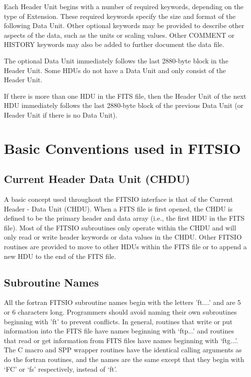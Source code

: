 Each Header Unit begins with a number of required keywords, depending
on the type of Extension.  These required keywords specify the size
and format of the following Data Unit.  Other optional keywords may
be provided to describe other aspects of the data, such as the units
or scaling values.  Other COMMENT or HISTORY keywords may also be added to
further document the data file.

The optional Data Unit immediately follows the last 2880-byte block in
the Header Unit.  Some HDUs do not have a Data Unit and only consist
of the Header Unit.

If there is more than one HDU in the FITS file, then the Header Unit
of the next HDU immediately follows the last 2880-byte block of the
previous Data Unit (or Header Unit if there is no Data Unit).

\section{Basic Conventions used in FITSIO}

\subsection{Current Header Data Unit (CHDU)}

A basic concept used throughout the FITSIO interface is that of the
Current Header - Data Unit (CHDU).  When a FITS file is first opened,
the  CHDU is defined to be the primary header and data array (i.e., the
first HDU in the FITS file).  Most of the FITSIO subroutines only
operate within the CHDU and will only read or write
header keywords or data values in the CHDU.  Other FITSIO routines are
provided to move to other HDUs within the FITS file or to append a new
HDU to the end of the FITS file.

\subsection{Subroutine Names}

All the fortran FITSIO subroutine names begin with the letters 'ft....'
and are 5 or 6 characters long.  Programmers should avoid naming their
own subroutines beginning with 'ft' to prevent conflicts.  In general,
routines that write or put information into the FITS file have names
beginning with `ftp...' and routines that read or get information from
FITS files have names beginning with `ftg...'.  The C macro and SPP wrapper
routines have the identical calling arguments as do the fortran routines, and
the names are the same except that they begin with `FC' or `fs' 
respectively, instead of `ft'.

